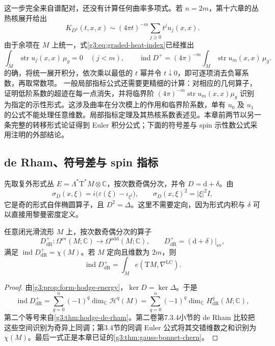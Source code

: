这一步完全来自谱配对，还没有计算任何曲率多项式。若 \(n=2m\)，第十六章的丛热核展开给出
\[
	K_{D^2}(t,x,x)\sim(4\pi t)^{-m}
	\sum_{j\ge0}t^j u_j(x,x).
\]
由于余项在 \(M\) 上统一，式\eqref{g3:eq:graded-heat-index}已经推出
\begin{equation}\label{g3:eq:integrated-supertrace-coefficients}
	\int_M\operatorname{str}u_j(x,x)\,\mu_g=0\quad(j<m),
	\qquad
	\operatorname{ind}D^+
	=(4\pi)^{-m}\int_M\operatorname{str}u_m(x,x)\,\mu_g.
\end{equation}
的确，将统一展开积分，依次乘以最低的 \(t\) 幂并令 \(t\downarrow0\)，即可逐项消去负幂系数，再取常数项。
\ProseParagraphBreak
一般局部指标公式还需要更精细的计算：对相应的几何算子，证明低阶系数的超迹在每一点消失，并将临界阶 \((4\pi)^{-m}\operatorname{str}u_m(x,x)\mu_g\) 识别为指定的示性形式。这涉及曲率在分次模上的作用和临界阶系数，单有 \(u_0\) 及 \(u_1\) 的公式不能处理任意维数。局部指标定理及其热核系数表述见\cite[第4章，4.1节]{BerlineGetzlerVergne2004}。本章前两节以另一条完整的转移形式论证得到 Euler 积分公式；下面的符号差与 spin 示性数公式采用注明的外部结论。

\subsection{de Rham、符号差与 spin 指标}
\label{g3:subsec:1704:04}
先取复外形式丛 \(E=\Lambda^*\mathrm T^*M\otimes\mathbb C\)，按次数奇偶分次，并令 \(D=\mathrm d+\delta\)。由
\[
	\sigma_D(x,\xi)=i\bigl(\varepsilon(\xi)-\iota_{\xi^\sharp}\bigr),
	\qquad \sigma_D(x,\xi)^2=|\xi|^2I,
\]
它是奇的形式自伴椭圆算子，且 \(D^2=\Delta\)。这里不需要定向，因为形式内积与 \(\delta\) 可以直接用黎曼密度定义。

\begin{proposition}\label{g3:prop:de-rham-analytic-index}
	任意闭光滑流形 \(M\) 上，按次数奇偶分次的算子
	\[
		D_{\mathrm{dR}}^+:
		\Omega^{\mathrm{ev}}(M;\mathbb C)
		\longrightarrow\Omega^{\mathrm{odd}}(M;\mathbb C),
		\qquad D_{\mathrm{dR}}^+=(\mathrm d+\delta)|_{\mathrm{ev}},
	\]
	满足 \(\operatorname{ind}D_{\mathrm{dR}}^+=\chi(M)\)。若 \(M\) 定向且维数为 \(2m\)，则
	\[
		\operatorname{ind}D_{\mathrm{dR}}^+
		=\int_M e(\mathrm TM,\nabla^{\mathrm{LC}}).
	\]
\end{proposition}
\begin{proof}
	由\cref{g3:prop:form-hodge-energy}，\(\ker D=\ker\Delta\)。于是
	\[
		\operatorname{ind}D_{\mathrm{dR}}^+
		=\sum_{q=0}^n(-1)^q\dim_{\mathbb C}\mathcal H^q(M)
		=\sum_{q=0}^n(-1)^q\dim_{\mathbb C}H_{\mathrm{dR}}^q(M;\mathbb C),
	\]
	第二个等号来自\cref{g3:thm:hodge-de-rham}。第二卷第7.3.4小节的 de Rham 比较把这些空间识别为奇异上同调；第3.4节的同调 Euler 公式将其交错维数之和识别为 \(\chi(M)\)。最后一式正是本章已证的\cref{g3:thm:gauss-bonnet-chern}。
\end{proof}

